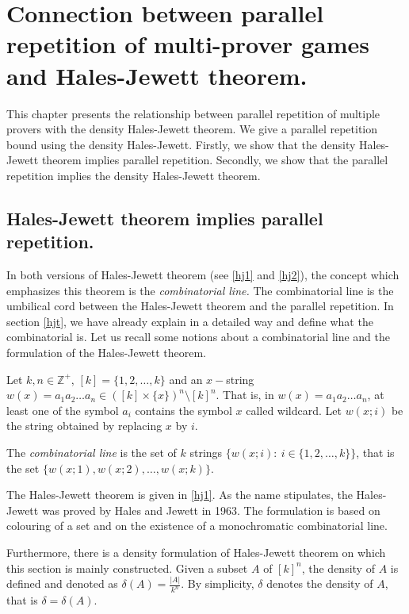

\chapter{Connection between parallel repetition of multi-prover games and  Hales-Jewett theorem.}

This chapter presents the relationship between parallel repetition of multiple provers with the density Hales-Jewett theorem. We give a parallel repetition bound using the density Hales-Jewett. Firstly, we show that the density Hales-Jewett theorem implies parallel repetition. Secondly, we show that the parallel repetition implies the density Hales-Jewett theorem.

\section{Hales-Jewett theorem implies parallel repetition.}

In both versions of Hales-Jewett theorem (see \eqref{hj1} and \eqref{hj2}), the concept which emphasizes this theorem is the \textit{combinatorial line.} The combinatorial line is the umbilical cord between the Hales-Jewett theorem and the parallel repetition. In section \eqref{hjt}, we have already explain in a detailed way
and define what the combinatorial is. Let us recall some notions about a combinatorial line and the formulation of the Hales-Jewett theorem.

Let $k, n\in \mathbb{Z}^+$, $[k]=\{1,2, \ldots,k\}$ and an $x-$string $w(x)=a_1a_2\ldots a_n \in ([k]\times\{x\})^n\setminus [k]^n.$ That is, in $w(x)=a_1a_2\ldots a_n$, at least one of the symbol   $a_i$ contains the symbol  $x$ called wildcard. Let $w(x;i)$ be the string obtained by replacing $x$ by $i$.

The \textit{combinatorial line} is the set of $k$ strings $\{w(x;i): \ i\in \{1,2,\ldots,k\} \}$, that is the set $\{w(x;1), w(x;2), \ldots, w(x;k)\}.$ 
 
The Hales-Jewett theorem is given in \eqref{hj1}.
As the name stipulates, the Hales-Jewett was proved by Hales and Jewett in 1963. The formulation is based on colouring of a set and on the existence of  a monochromatic combinatorial line.

Furthermore, there is a density formulation of Hales-Jewett theorem on which this section is mainly constructed. Given a subset $A$ of $[k]^n$, the density of $A$ is defined and denoted as $\delta(A)=\frac{|A|}{k^n}.$ By simplicity, $\delta$ denotes the density of $A$, that is $\delta=\delta(A).$

